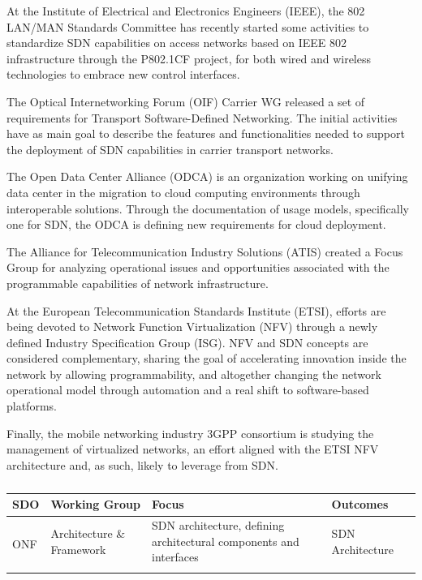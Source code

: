 {At the Institute of Electrical and Electronics Engineers (IEEE), the 802 LAN/MAN Standards Committee has recently started some activities to standardize SDN capabilities on access networks based on IEEE 802 infrastructure through the P802.1CF project, for both wired and wireless technologies to embrace new control interfaces.%

The Optical Internetworking Forum (OIF) Carrier WG released a set of requirements for Transport Software-Defined Networking. The initial activities have as main goal to describe the features and functionalities needed to support the deployment of SDN capabilities in carrier transport networks.

The Open Data Center Alliance (ODCA) is an organization working on unifying data center in the migration to cloud computing environments through interoperable solutions. Through the documentation of usage models, specifically one for SDN, the ODCA is defining new requirements for cloud deployment. 

The Alliance for Telecommunication Industry Solutions (ATIS) created a Focus Group for analyzing operational issues and opportunities associated with the programmable capabilities of network infrastructure. %

At the European Telecommunication Standards Institute (ETSI), efforts are being devoted to Network Function Virtualization (NFV) through a newly defined Industry Specification Group (ISG). 
NFV and SDN concepts are considered complementary, sharing the goal of accelerating innovation inside the network by allowing programmability, and altogether changing the network operational model through automation and a real shift to software-based platforms.

Finally, the mobile networking industry 3GPP consortium is studying the management of virtualized networks, an effort aligned with the ETSI NFV architecture and, as such, likely to leverage from SDN.

{\renewcommand{\arraystretch}{1.4}
\begin{table}[!htp]
\caption{}
\label{tab:standardization}
\begin{center}
\footnotesize
\begin{tabularx}{\linewidth}{p{0.8cm}p{3.8cm}Xp{4.6cm}}
\hline
\textbf{SDO} & \textbf{Working Group} & \textbf{Focus}  & \textbf{Outcomes} \\
\hline
\multirow{16}{*}{ONF} 
& Architecture \& Framework & SDN architecture, defining architectural components and interfaces & SDN Architecture~\cite{SDNARCH}  \\\cline{2-4}


\end{tabularx}
\end{center}
\end{table}}}
